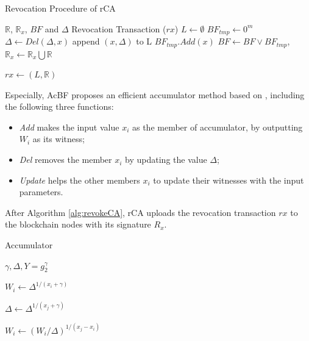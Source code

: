 \documentclass[conference]{IEEEtran}
\begin{document}
\begin{algorithm}[t]
\renewcommand{\algorithmicensure}{\textbf{Output:}}
	\caption{Revocation Procedure of rCA}\label{alg:revokeCA}
	\begin{algorithmic}[1]
		\Require $\mathbb{R}$, $\mathbb{R}_x$, $BF$ and $\Delta$ %
		\Ensure Revocation Transaction ($rx$)
		\State $L\gets \emptyset$
		\State $BF_{tmp} \gets 0^m$ 
		\State $\Delta \gets Del(\Delta, x)$ 
		\State append $(x, \Delta)$ to L
		\Else
		\State $BF_{tmp}.Add(x)$ %
		\EndIf
		\EndFor
		\State $BF \gets BF \lor BF_{tmp}$, $\mathbb{R}_x \gets \mathbb{R}_x \bigcup \mathbb{R} $
		
		\Return $rx \gets (L, \mathbb{R})$
	\end{algorithmic}
\end{algorithm}

Especially, AcBF proposes an efficient accumulator method based on \cite{accumulator}, including the following three functions:
\begin{itemize}
	\item \textit{Add} makes the input value $x_i$ as the member of accumulator, by outputting $W_i$ as its witness;
	\item \textit{Del} removes the member $x_i$ by updating the value $\Delta$;
	\item \textit{Update} helps the other members $x_i$ to update their witnesses with the input parameters.
\end{itemize}
After Algorithm \ref{alg:revokeCA}, rCA uploads the revocation transaction $rx$ to the blockchain nodes with its signature $R_x$.

\begin{algorithm}[t]
	\renewcommand{\algorithmicensure}{\textbf{Output:}}
	\caption{Accumulator}\label{alg:accumulate}
	\begin{algorithmic}[1]
		\Require $\gamma, \Delta, Y= g_2^\gamma$ %
		
		\Return $W_i \gets \Delta ^{1/(x_i + \gamma)}$
		\EndFunction
		
		
		\Return $\Delta \gets \Delta ^{1/(x_j + \gamma)}$
		\EndFunction
		 \label{fuction:update}
		
		\Return $W_i \gets (W_i/\Delta)^{1/(x_j - x_i)}$
		\EndFunction
	\end{algorithmic}
\end{algorithm}
\end{document}
